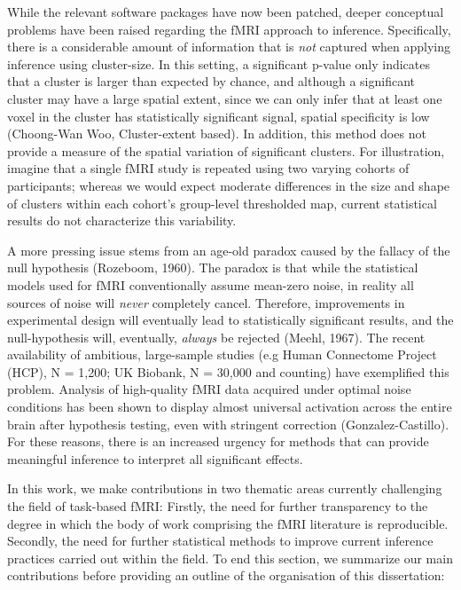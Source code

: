 While the relevant software packages have now been patched, deeper conceptual problems have been raised regarding the fMRI approach to inference. Specifically, there is a considerable amount of information that is \textit{not} captured when applying inference using cluster-size. In this setting, a significant p-value only indicates that a cluster is larger than expected by chance, and although a significant cluster may have a large spatial extent, since we can only infer that at least one voxel in the cluster has statistically significant signal, spatial specificity is low (Choong-Wan Woo, Cluster-extent based). In addition, this method does not provide a measure of the spatial variation of significant clusters. For illustration, imagine that a single fMRI study is repeated using two varying cohorts of participants; whereas we would expect moderate differences in the size and shape of clusters within each cohort's group-level thresholded map, current statistical results do not characterize this variability. 

A more pressing issue stems from an age-old paradox caused by the fallacy of the null hypothesis (Rozeboom, 1960). The paradox is that while the statistical models used for fMRI conventionally assume mean-zero noise, in reality all sources of noise will \textit{never} completely cancel. Therefore, improvements in experimental design will eventually lead to statistically significant results, and the null-hypothesis will, eventually, \textit{always} be rejected (Meehl, 1967). The recent availability of ambitious, large-sample studies (e.g Human Connectome Project (HCP), N = 1,200; UK Biobank, N = 30,000 and counting) have exemplified this problem. Analysis of high-quality fMRI data acquired under optimal noise conditions has been shown to display almost universal activation across the entire brain after hypothesis testing, even with stringent correction (Gonzalez-Castillo). For these reasons, there is an increased urgency for methods that can provide meaningful inference to interpret all significant effects. 

\bigskip

\noindent In this work, we make contributions in two thematic areas currently challenging the field of task-based fMRI: Firstly, the need for further transparency to the degree in which the body of work comprising the fMRI literature is reproducible. Secondly, the need for further statistical methods to improve current inference practices carried out within the field. To end this section, we summarize our main contributions before providing an outline of the organisation of this dissertation: 

